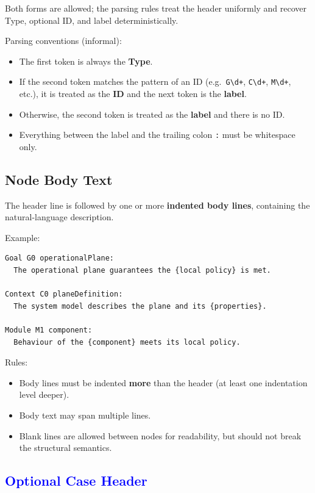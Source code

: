 \documentclass[11pt]{article}
\begin{document}
Both forms are allowed; the parsing rules treat the header uniformly and recover Type, optional ID, and label deterministically.

Parsing conventions (informal):
\begin{itemize}[leftmargin=2em]
  \item The first token is always the \textbf{Type}.
  \item If the second token matches the pattern of an ID (e.g.\ \texttt{G\textbackslash d+}, \texttt{C\textbackslash d+}, \texttt{M\textbackslash d+}, etc.), it is treated as the \textbf{ID} and the next token is the \textbf{label}.
  \item Otherwise, the second token is treated as the \textbf{label} and there is no ID.
  \item Everything between the label and the trailing colon \texttt{:} must be whitespace only.
\end{itemize}

\subsection{Node Body Text}

The header line is followed by one or more \textbf{indented body lines}, containing the natural-language description.

Example:
\begin{verbatim}
Goal G0 operationalPlane:
  The operational plane guarantees the {local policy} is met.

Context C0 planeDefinition:
  The system model describes the plane and its {properties}.

Module M1 component:
  Behaviour of the {component} meets its local policy.
\end{verbatim}

Rules:
\begin{itemize}[leftmargin=2em]
  \item Body lines must be indented \textbf{more} than the header (at least one indentation level deeper).
  \item Body text may span multiple lines.
  \item Blank lines are allowed between nodes for readability, but should not break the structural semantics.
\end{itemize}

\subsection{\textcolor{blue}{Optional Case Header}}
\end{document}
